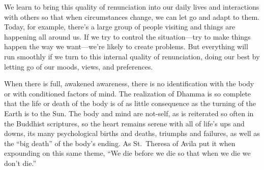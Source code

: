We learn to bring this quality of renunciation into our daily lives and 
interactions with others so that when circumstances change, we can let 
go and adapt to them. Today, for example, there's a large group of 
people visiting and things are happening all around us. If we try to 
control the situation---try to make things happen the way we 
want---we're likely to create problems. But everything will run 
smoothly if we turn to this internal quality of renunciation, doing our 
best by letting go of our moods, views, and preferences.


When there is full, awakened awareness, there is no identification with 
the body or with conditioned factors of mind. The realization of Dhamma 
is so complete that the life or death of the body is of as little 
consequence as the turning of the Earth is to the Sun. The body and 
mind are not-self, as is reiterated so often in the Buddhist 
scriptures, so the heart remains serene with all of life's ups and 
downs, its many psychological births and deaths, triumphs and failures, 
as well as the ``big death'' of the body's ending. As St. Theresa of 
Avila put it when expounding on this same theme, ``We die before we die 
so that when we die we don't die.''

